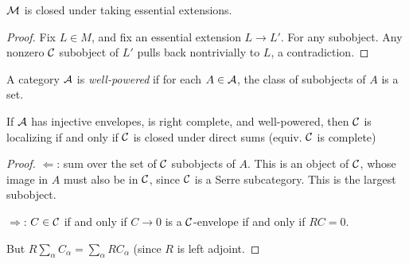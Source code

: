 \begin{por}
$\mathcal{M}$ is closed under taking essential extensions.
\end{por}
\begin{proof}
Fix $L \in M$, and fix an essential extension $L \to L'$. For any 
subobject. Any nonzero $\mathcal{C}$ subobject of $L'$ pulls back 
nontrivially to $L$, a contradiction.
\end{proof}

\begin{definition}
A category $\mathcal{A}$ is \emph{well-powered} if for each $A \in
\mathcal{A}$, the class of subobjects of $A$ is a set.
\end{definition}

\begin{cor}
If $\mathcal{A}$ has injective envelopes, is right complete, and
well-powered, then $\mathcal{C}$ is localizing if and only if $\mathcal{C}$
is closed under direct sums (equiv. $\mathcal{C}$ is complete)
\end{cor}
\begin{proof}
\noindent $\Leftarrow$: sum over the set of $\mathcal{C}$ subobjects
of $A$. This is an object of $\mathcal{C}$, whose image in $A$ must
also be in $\mathcal{C}$, since $\mathcal{C}$ is a Serre subcategory. This
is the largest subobject.

\noindent $\Rightarrow$: $C \in \mathcal{C}$ if and only if $C \to 0$
is a $\mathcal{C}$-envelope if and only if $RC = 0$.

But $R\sum_{\alpha} C_\alpha = \sum_{\alpha} RC_\alpha$ (since $R$
is left adjoint.
\end{proof}

